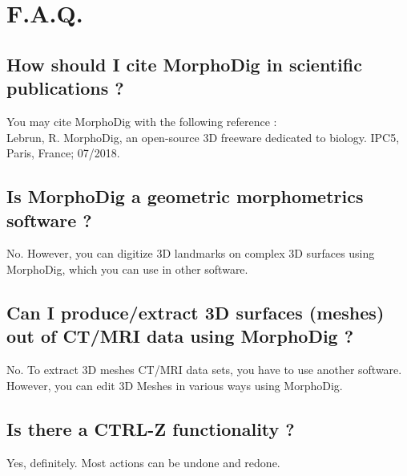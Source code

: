 
 \chapter{F.A.Q.}
		\minitoc  
    \section{How should I cite MorphoDig in scientific publications ?}
    You may  cite MorphoDig with the following reference :\\
		Lebrun, R. MorphoDig, an open-source 3D freeware dedicated to biology. IPC5, Paris, France; 07/2018.
    \section{Is MorphoDig a geometric morphometrics software ?}
    No. However, you can digitize 3D landmarks on complex 3D surfaces using MorphoDig, which you 
		can use in other software.
		\section{Can I produce/extract 3D surfaces (meshes) out of CT/MRI data using MorphoDig ?}
		No. To extract 3D meshes CT/MRI data sets, you have to use another software. However, you can edit 
		3D Meshes in various ways using MorphoDig.
		\section{Is there a CTRL-Z functionality ?}
		Yes, definitely. Most actions can be undone and redone. 